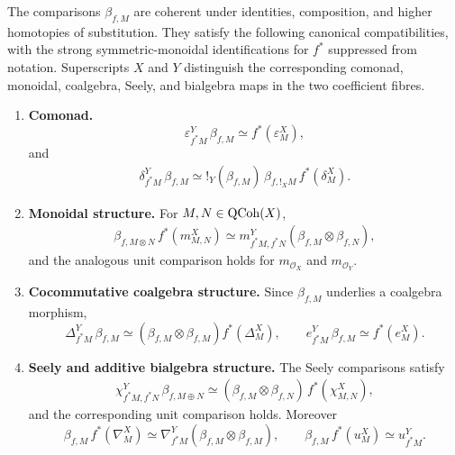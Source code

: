 \begin{proposition}
\label{prop:cofree-substitution-coherence}
The comparisons \(\beta_{f,M}\) are coherent under identities, composition,
and higher homotopies of substitution. They satisfy the following canonical
compatibilities, with the strong symmetric-monoidal identifications for
\(f^*\) suppressed from notation. Superscripts \(X\) and \(Y\) distinguish
the corresponding comonad, monoidal, coalgebra, Seely, and bialgebra maps in
the two coefficient fibres.
\begin{enumerate}[label=(\roman*)]
    \item \textbf{Comonad.}
    \[
        \varepsilon^{Y}_{f^*M}\,\beta_{f,M}
        \simeq
        f^*(\varepsilon^{X}_M),
    \]
    and
    \[
    \begin{aligned}
        \delta^{Y}_{f^*M}\,\beta_{f,M}
        \simeq
        !_Y(\beta_{f,M})\,
        \beta_{f,!_XM}\,
        f^*(\delta^{X}_M).
    \end{aligned}
    \]

    \item \textbf{Monoidal structure.}
    For \(M,N\in\operatorname{QCoh}(X)\),
    \[
    \begin{aligned}
        \beta_{f,M\otimes N}\,f^*(m^X_{M,N})
        \simeq
        m^Y_{f^*M,f^*N}
        (\beta_{f,M}\otimes\beta_{f,N}),
    \end{aligned}
    \]
    and the analogous unit comparison holds for
    \(m_{\mathcal O_X}\) and \(m_{\mathcal O_Y}\).

    \item \textbf{Cocommutative coalgebra structure.}
    Since \(\beta_{f,M}\) underlies a coalgebra morphism,
    \[
        \Delta^Y_{f^*M}\,\beta_{f,M}
        \simeq
        (\beta_{f,M}\otimes\beta_{f,M})f^*(\Delta^X_M),
        \qquad
        e^Y_{f^*M}\,\beta_{f,M}
        \simeq
        f^*(e^X_M).
    \]

    \item \textbf{Seely and additive bialgebra structure.}
    The Seely comparisons satisfy
    \[
    \begin{aligned}
        \chi^Y_{f^*M,f^*N}\,\beta_{f,M\oplus N}
        \simeq
        (\beta_{f,M}\otimes\beta_{f,N})\,f^*(\chi^X_{M,N}),
    \end{aligned}
    \]
    and the corresponding unit comparison holds. Moreover
    \[
        \beta_{f,M}\,f^*(\nabla^X_M)
        \simeq
        \nabla^Y_{f^*M}(\beta_{f,M}\otimes\beta_{f,M}),
        \qquad
        \beta_{f,M}\,f^*(u^X_M)
        \simeq
        u^Y_{f^*M}.
    \]


\end{enumerate}
\end{proposition}
